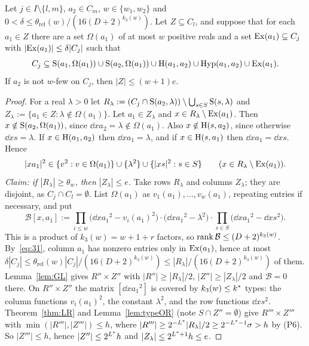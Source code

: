 \begin{lemma}\label{lem:step3}
Let $j\in I\setminus\{l,m\}$, $a_2\in C_m$, $w\in\{w_1,w_2\}$ and $0<\delta\le\theta_{\mathrm{rel}}(w)/(16(D+2)^{k_3(w)})$. Let
$Z\subseteq C_l$, and suppose that for each $a_1\in Z$ there are a set $\Omega(a_1)$ of at most $w$ positive reals and a
set $\mathrm{Ex}(a_1)\subseteq C_j$ with $|\mathrm{Ex}(a_1)|\le\delta|C_j|$ such that
\[
C_j\subseteq\mathrm{S}(a_1,\Omega(a_1))\cup\mathrm{S}(a_2,\Omega(a_1))\cup\mathrm{H}(a_1,a_2)\cup\mathrm{Hyp}(a_1,a_2)\cup\mathrm{Ex}(a_1).
\]
If $a_2$ is not $w$-few on $C_j$, then $|Z|\le(w+1)e$.
\end{lemma}
\begin{proof}
For a real $\lambda>0$ let $R_\lambda:=(C_j\cap\mathrm{S}(a_2,\lambda))\setminus\bigcup_{s\in S}\mathrm{S}(s,\lambda)$ and
$Z_\lambda:=\{a_1\in Z:\lambda\notin\Omega(a_1)\}$. Let $a_1\in Z_\lambda$ and $x\in R_\lambda\setminus\mathrm{Ex}(a_1)$. Then
$x\notin\mathrm{S}(a_2,\Omega(a_1))$, since $\dd x{a_2}=\lambda\notin\Omega(a_1)$. Also $x\notin\mathrm{H}(s,a_2)$, since otherwise
$\dd xs=\lambda$. If $x\in\mathrm{H}(a_1,a_2)$ then $\dd x{a_1}=\lambda$, and if $x\in\mathrm{H}(s,a_1)$ then $\dd x{a_1}=\dd xs$.
Hence
\begin{equation}\label{eq:31}
|xa_1|^2\in\{v^2:v\in\Omega(a_1)\}\cup\{\lambda^2\}\cup\{|xs|^2:s\in S\}\qquad(x\in R_\lambda\setminus\mathrm{Ex}(a_1)).
\end{equation}
\emph{Claim: if $|R_\lambda|\ge\theta_w$, then $|Z_\lambda|\le e$.} Take rows $R_\lambda$ and columns $Z_\lambda$; they are
disjoint, as $C_j\cap C_l=\emptyset$. List $\Omega(a_1)$ as $v_1(a_1),\dots,v_w(a_1)$, repeating entries if necessary, and put
\[
\mathcal B[x,a_1]:=\prod_{i\le w}\bigl(\dd x{a_1}^2-v_i(a_1)^2\bigr)\cdot\bigl(\dd x{a_1}^2-\lambda^2\bigr)\cdot\prod_{s\in S}\bigl(\dd x{a_1}^2-\dd xs^2\bigr).
\]
This is a product of $k_3(w)=w+1+r$ factors, so $\operatorname{rank}\mathcal B\le(D+2)^{k_3(w)}$. By~\eqref{eq:31}, column $a_1$ has nonzero
entries only in $\mathrm{Ex}(a_1)$, hence at most $\delta|C_j|\le\theta_{\mathrm{rel}}(w)|C_j|/(16(D+2)^{k_3(w)})\le|R_\lambda|/(16(D+2)^{k_3(w)})$
of them. Lemma~\ref{lem:GL} gives $R''\times Z''$ with $|R''|\ge|R_\lambda|/2$, $|Z''|\ge|Z_\lambda|/2$ and $\mathcal B=0$ there.
On $R''\times Z''$ the matrix $[\dd x{a_1}^2]$ is covered by $k_3(w)\le k^{\ast}$ types: the column functions $v_i(a_1)^2$, the
constant $\lambda^2$, and the row functions $\dd xs^2$. Theorem~\ref{thm:LR} and Lemma~\ref{lem:typeOR} (note
$S\cap Z''=\emptyset$) give $R'''\times Z'''$ with $\min(|R'''|,|Z'''|)\le h$, where
$|R'''|\ge2^{-L^{\ast}}|R_\lambda|/2\ge2^{-L^{\ast}-1}\sigma>h$ by (P6). So $|Z'''|\le h$, hence $|Z''|\le2^{L^{\ast}}h$ and
$|Z_\lambda|\le2^{L^{\ast}+1}h\le e$.


\end{proof}
